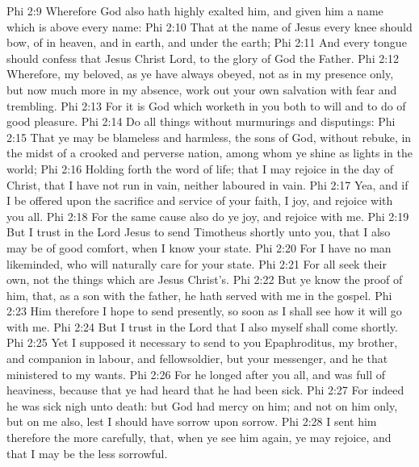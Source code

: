 \vs Phi 2:9 Wherefore God also hath highly exalted him, and given him a name which is above every name:
\vs Phi 2:10 That at the name of Jesus every knee should bow, of  in heaven, and  in earth, and  under the earth;
\vs Phi 2:11 And  every tongue should confess that Jesus Christ  Lord, to the glory of God the Father.
\vs Phi 2:12 Wherefore, my beloved, as ye have always obeyed, not as in my presence only, but now much more in my absence, work out your own salvation with fear and trembling.
\vs Phi 2:13 For it is God which worketh in you both to will and to do of  good pleasure.
\vs Phi 2:14 Do all things without murmurings and disputings:
\vs Phi 2:15 That ye may be blameless and harmless, the sons of God, without rebuke, in the midst of a crooked and perverse nation, among whom ye shine as lights in the world;
\vs Phi 2:16 Holding forth the word of life; that I may rejoice in the day of Christ, that I have not run in vain, neither laboured in vain.
\vs Phi 2:17 Yea, and if I be offered upon the sacrifice and service of your faith, I joy, and rejoice with you all.
\vs Phi 2:18 For the same cause also do ye joy, and rejoice with me.
\vs Phi 2:19 But I trust in the Lord Jesus to send Timotheus shortly unto you, that I also may be of good comfort, when I know your state.
\vs Phi 2:20 For I have no man likeminded, who will naturally care for your state.
\vs Phi 2:21 For all seek their own, not the things which are Jesus Christ's.
\vs Phi 2:22 But ye know the proof of him, that, as a son with the father, he hath served with me in the gospel.
\vs Phi 2:23 Him therefore I hope to send presently, so soon as I shall see how it will go with me.
\vs Phi 2:24 But I trust in the Lord that I also myself shall come shortly.
\vs Phi 2:25 Yet I supposed it necessary to send to you Epaphroditus, my brother, and companion in labour, and fellowsoldier, but your messenger, and he that ministered to my wants.
\vs Phi 2:26 For he longed after you all, and was full of heaviness, because that ye had heard that he had been sick.
\vs Phi 2:27 For indeed he was sick nigh unto death: but God had mercy on him; and not on him only, but on me also, lest I should have sorrow upon sorrow.
\vs Phi 2:28 I sent him therefore the more carefully, that, when ye see him again, ye may rejoice, and that I may be the less sorrowful.
